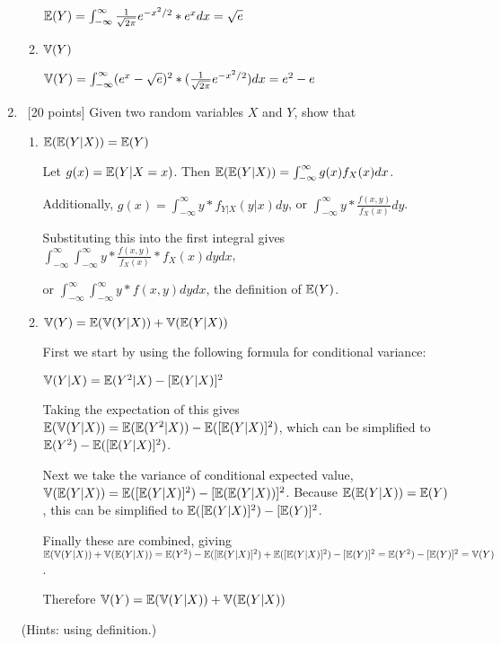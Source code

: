 \documentclass[12pt, fullpage,letterpaper]{article}
\begin{document}
\begin{enumerate}
\begin{enumerate}
	$\mathbb{E}(Y) = \int_{-\infty}^{\infty}\frac{1}{\sqrt{2\pi}}e^{-x^2/2} * e^x dx = \sqrt{e}$
	
	\item $\mathbb{V}(Y)$
	
	$\mathbb{V}(Y) = \int_{-\infty}^{\infty}(e^x - \sqrt{e})^2 * (\frac{1}{\sqrt{2\pi}}e^{-x^2/2})dx = e^2 - e$
\end{enumerate}

\item~[20 points]  Given two random variables $X$ and $Y$, show that 
\begin{enumerate}
\item $\mathbb{E}(\mathbb{E}(Y|X)) = \mathbb{E}(Y)$

Let $g(x) = \mathbb{E}(Y|X = x)$. Then $\mathbb{E}(\mathbb{E}(Y|X)) = \int_{-\infty}^{\infty}g(x)f_X(x)dx$.

Additionally, $g(x) = \int_{-\infty}^{\infty}y*f_{Y|X}(y|x)dy$, or $\int_{-\infty}^{\infty}y*\frac{f(x,y)}{f_X(x)}dy$.

Substituting this into the first integral gives $\int_{-\infty}^{\infty}\int_{-\infty}^{\infty}y*\frac{f(x,y)}{f_X(x)}*f_X(x)dydx$, 

or $\int_{-\infty}^{\infty}\int_{-\infty}^{\infty}y*f(x,y)dydx$, the definition of $\mathbb{E}(Y)$.

\item$\mathbb{V}(Y) = \mathbb{E}(\mathbb{V}(Y|X)) + \mathbb{V}(\mathbb{E}(Y|X))$

First we start by using the following formula for conditional variance:

$\mathbb{V}(Y|X) =  \mathbb{E}(Y^2|X) - [\mathbb{E}(Y|X)]^2$

Taking the expectation of this gives $\mathbb{E}(\mathbb{V}(Y|X)) = \mathbb{E}(\mathbb{E}(Y^2|X)) - \mathbb{E}([\mathbb{E}(Y|X)]^2)$, which can be simplified to $\mathbb{E}(Y^2) - \mathbb{E}([\mathbb{E}(Y|X)]^2)$.

Next we take the variance of conditional expected value, $\mathbb{V}(\mathbb{E}(Y|X)) = \mathbb{E}([\mathbb{E}(Y|X)]^2) - [\mathbb{E}(\mathbb{E}(Y|X))]^2$. Because $\mathbb{E}(\mathbb{E}(Y|X)) = \mathbb{E}(Y)$, this can be simplified to $\mathbb{E}([\mathbb{E}(Y|X)]^2) - [\mathbb{E}(Y)]^2$.

Finally these are combined, giving $\mathbb{E}(\mathbb{V}(Y|X)) + \mathbb{V}(\mathbb{E}(Y|X)) = \mathbb{E}(Y^2) - \mathbb{E}([\mathbb{E}(Y|X)]^2) + \mathbb{E}([\mathbb{E}(Y|X)]^2) - [\mathbb{E}(Y)]^2 = \mathbb{E}(Y^2) - [\mathbb{E}(Y)]^2 = \mathbb{V}(Y)$.

Therefore $\mathbb{V}(Y) = \mathbb{E}(\mathbb{V}(Y|X)) + \mathbb{V}(\mathbb{E}(Y|X))$

\end{enumerate}
(Hints: using definition.)


\end{enumerate}
\end{document}

